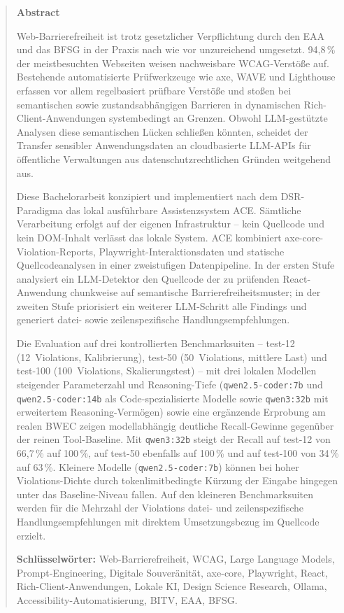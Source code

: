 \begin{abstract}
\thispagestyle{kapitelkopfzeile}
\textbf{Abstract}

Web-Barrierefreiheit ist trotz gesetzlicher Verpflichtung durch den \ac{EAA} und das \ac{BFSG} in der Praxis nach wie vor unzureichend umgesetzt. 94{,}8\,\% der meistbesuchten Webseiten weisen nachweisbare \acs{WCAG}-Verstöße auf. Bestehende automatisierte Prüfwerkzeuge wie axe, WAVE und Lighthouse erfassen vor allem regelbasiert prüfbare Verstöße und stoßen bei semantischen sowie zustands\-ab\-hängigen Barrieren in dynamischen Rich-Client-Anwendungen systembedingt an Grenzen. Obwohl \acs{LLM}-gestützte Analysen diese semantischen Lücken schließen könnten, scheidet der Transfer sensibler Anwendungsdaten an cloudbasierte \acs{LLM}-\acs{API}s für öffentliche Verwaltungen aus datenschutzrechtlichen Gründen weitgehend aus.

Diese Bachelorarbeit konzipiert und implementiert nach dem \ac{DSR}-Paradigma das lokal ausführbare Assistenzsystem \ac{ACE}. Sämtliche Verarbeitung erfolgt auf der eigenen Infrastruktur -- kein Quellcode und kein \acs{DOM}-Inhalt verlässt das lokale System. \ac{ACE} kombiniert axe-core-Violation-Reports, Playwright-Interaktionsdaten und statische Quellcodeanalysen in einer zweistufigen Datenpipeline. In der ersten Stufe analysiert ein \acs{LLM}-Detektor den Quellcode der zu prüfenden React-Anwendung chunkweise auf semantische Barrierefreiheitsmuster; in der zweiten Stufe priorisiert ein weiterer \acs{LLM}-Schritt alle Findings und generiert datei- sowie zeilenspezifische Handlungsempfehlungen.

Die Evaluation auf drei kontrollierten Benchmarksuiten -- test-12 (12~Violations, Kalibrierung), test-50 (50~Violations, mittlere Last) und test-100 (100~Violations, Skalierungstest) -- mit drei lokalen Modellen steigender Parameterzahl und Reasoning-Tiefe (\texttt{qwen2.5-coder:7b} und \texttt{qwen2.5-coder:14b} als Code-spezialisierte Modelle sowie \texttt{qwen3:32b} mit erweitertem Reasoning-Vermögen) sowie eine ergänzende Erprobung am realen \ac{BWEC} zeigen modellabhängig deutliche Recall-Gewinne gegenüber der reinen Tool-Baseline. Mit \texttt{qwen3:32b} steigt der Recall auf test-12 von 66{,}7\,\% auf 100\,\%, auf test-50 ebenfalls auf 100\,\% und auf test-100 von 34\,\% auf 63\,\%. Kleinere Modelle (\texttt{qwen2.5-coder:7b}) können bei hoher Violations-Dichte durch tokenlimitbedingte Kürzung der Eingabe hingegen unter das Baseline-Niveau fallen. Auf den kleineren Benchmarksuiten werden für die Mehrzahl der Violations datei- und zeilenspezifische Handlungsempfehlungen mit direktem Umsetzungsbezug im Quellcode erzielt.

\medskip
\noindent\textbf{Schlüsselwörter:} Web-Barrierefreiheit, \acs{WCAG}, Large Language Models, Prompt-Engineering, Digitale Souveränität, axe-core, Playwright, React, Rich-Client-Anwendungen, Lokale \acs{KI}, Design Science Research, Ollama, Accessibility-Automatisierung, \acs{BITV}, \ac{EAA}, \acs{BFSG}.

\end{abstract}

